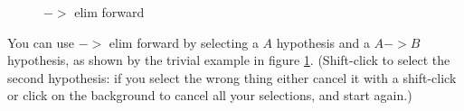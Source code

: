 \documentclass[11pt]{book}
\newcommand{\figref}[1]{figure \ref{fig:#1}}
\begin{document}
\begin{figure}
\centering
{}
\qquad
{}
\caption{$->$ elim forward}
\label{fig:arrowelimforward}
\end{figure}

You can use $->$ elim forward by selecting a $A$ hypothesis and a $A->B$ hypothesis, as shown by the trivial example in \figref{arrowelimforward}. (Shift-click to select the second hypothesis: if you select the wrong thing either cancel it with a shift-click or click on the background to cancel all your selections, and start again.)
\end{document}
